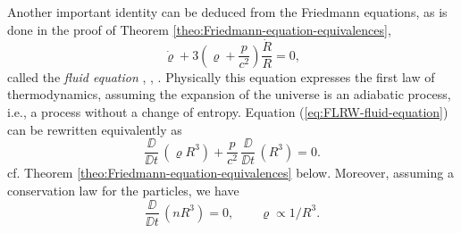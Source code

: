 Another important identity can be deduced from the Friedmann equations,
as is done in the proof of Theorem \ref{theo:Friedmann-equation-equivalences},
\begin{equation}
	{\dot{\varrho}} + 3 \left(\varrho + \frac{p}{c^2} \right) \frac{\dot{R}}{R} = 0
	,
	\label{eq:FLRW-fluid-equation}
\end{equation}
called the \emph{fluid equation} \cite[59]{Ryden-2017},  \cite[(5.73)]{Sexl-Urbantke-1987}, \cite[(26,9)]{Stephani-1991}.
Physically this equation expresses the first law of thermodynamics, assuming the expansion of the universe is an adiabatic process, i.e., a process without a change of entropy.
Equation (\ref{eq:FLRW-fluid-equation}) can be rewritten equivalently as
\begin{equation}
	\frac{\DD}{\DD t} \, (\varrho R^3) 
	+ \frac{p}{c^2} \, \frac{\DD}{\DD t} \, (R^3) = 0
	.
	\label{eq:FLRW-dynamics-4}
\end{equation}
cf. Theorem \ref{theo:Friedmann-equation-equivalences} below.
Moreover, assuming a conservation law for the particles, we have
\begin{equation}
	\frac{\DD}{\DD t} \, (n R^3) = 0,
	\qquad
	\varrho \propto 1/R^3
	.
	\label{eq:FLRW-dynamics-5}
\end{equation}

